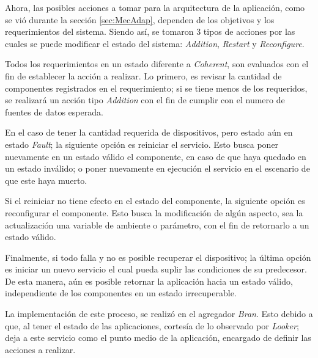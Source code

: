 Ahora, las posibles acciones a tomar para la arquitectura de la aplicación, como se vió durante la sección \ref{sec:MecAdap}, dependen de los objetivos y los requerimientos del sistema. Siendo así, se tomaron 3 tipos de acciones por las cuales se puede modificar el estado del sistema: \textit{Addition}, \textit{Restart} y \textit{Reconfigure}.

Todos los requerimientos en un estado diferente a \textit{Coherent}, son evaluados con el fin de establecer la acción a realizar. Lo primero, es revisar la cantidad de componentes registrados en el requerimiento; si se tiene menos de los requeridos, se realizará un acción tipo \textit{Addition} con el fin de cumplir con el numero de fuentes de datos esperada.

En el caso de tener la cantidad requerida de dispositivos, pero estado aún en estado \textit{Fault}; la siguiente opción es reiniciar el servicio. Esto busca poner nuevamente en un estado válido el componente, en caso de que haya quedado en un estado inválido; o poner nuevamente en ejecución el servicio en el escenario de que este haya muerto.

Si el reiniciar no tiene efecto en el estado del componente, la siguiente opción es reconfigurar el componente. Esto busca la modificación de algún aspecto, sea la actualización una variable de ambiente o parámetro, con el fin de retornarlo a un estado válido. 
 
Finalmente, si todo falla y no es posible recuperar el dispositivo; la última opción es iniciar un nuevo servicio el cual pueda suplir las condiciones de su predecesor. De esta manera, aún es posible retornar la aplicación hacia un estado válido, independiente de los componentes en un estado irrecuperable.

La implementación de este proceso, se realizó en el agregador \textit{Bran}. Esto debido a que, al tener el estado de las aplicaciones, cortesía de lo observado por \textit{Looker}; deja a este servicio como el punto medio de la aplicación, encargado de definir las acciones a realizar.